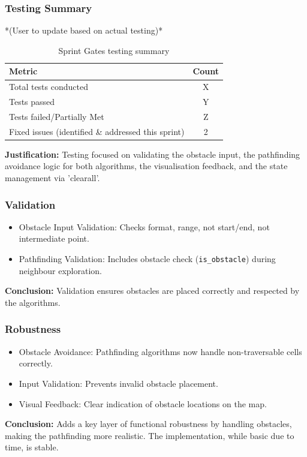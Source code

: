 \newpage

\subsubsection{Testing Summary}
*(User to update based on actual testing)*
\begin{table}[htbp]
	\centering
	\begin{tabular}{|l|c|}
		\hline
		\textbf{Metric} & \textbf{Count} \\
		\hline
		Total tests conducted & X \\ %
		\hline
		Tests passed & Y \\
		\hline
		Tests failed/Partially Met & Z \\
		\hline
		Fixed issues (identified \& addressed this sprint) & 2 \\ %
		\hline
	\end{tabular}
	\caption{Sprint Gates testing summary}
\end{table}
\textbf{Justification:} Testing focused on validating the obstacle input, the pathfinding avoidance logic for both algorithms, the visualisation feedback, and the state management via 'clearall'.

\subsubsection{Validation}
\begin{itemize}
	\item Obstacle Input Validation: Checks format, range, not start/end, not intermediate point.
	\item Pathfinding Validation: Includes obstacle check (\verb|is_obstacle|) during neighbour exploration.
\end{itemize}
\textbf{Conclusion:} Validation ensures obstacles are placed correctly and respected by the algorithms.

\subsubsection{Robustness}
\begin{itemize}
	\item Obstacle Avoidance: Pathfinding algorithms now handle non-traversable cells correctly.
	\item Input Validation: Prevents invalid obstacle placement.
	\item Visual Feedback: Clear indication of obstacle locations on the map.
\end{itemize}
\textbf{Conclusion:} Adds a key layer of functional robustness by handling obstacles, making the pathfinding more realistic. The implementation, while basic due to time, is stable.


